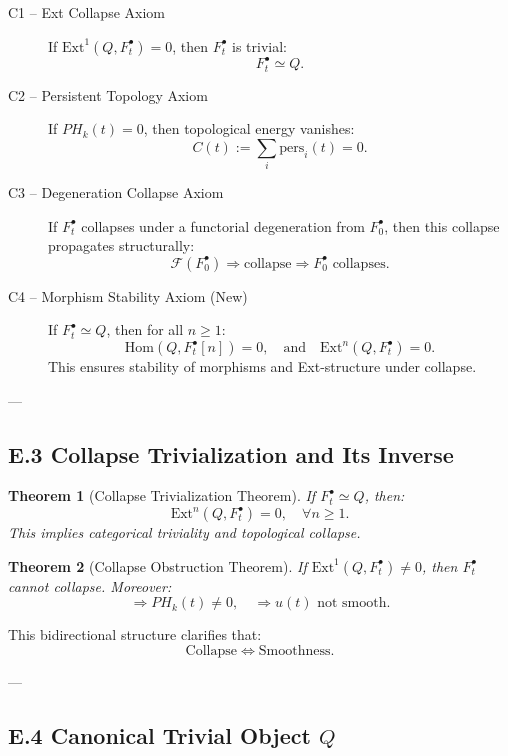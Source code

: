 \documentclass[11pt]{article}
\newtheorem{theorem}{Theorem}[section]
\begin{document}
\begin{description}
  \item[C1 – Ext Collapse Axiom]  
  If $\mathrm{Ext}^1(Q, F^\bullet_t) = 0$, then $F^\bullet_t$ is trivial:
  \[
  F^\bullet_t \simeq Q.
  \]

  \item[C2 – Persistent Topology Axiom]  
  If $PH_k(t) = 0$, then topological energy vanishes:
  \[
  C(t) := \sum_i \text{pers}_i(t) = 0.
  \]

  \item[C3 – Degeneration Collapse Axiom]  
  If $F^\bullet_t$ collapses under a functorial degeneration from $F^\bullet_0$,  
  then this collapse propagates structurally:
  \[
  \mathcal{F}(F^\bullet_0) \Rightarrow \text{collapse} \Rightarrow F^\bullet_0 \text{ collapses.}
  \]

  \item[C4 – Morphism Stability Axiom (New)]  
  If $F^\bullet_t \simeq Q$, then for all $n \geq 1$:
  \[
  \mathrm{Hom}(Q, F^\bullet_t[n]) = 0,
  \quad \text{and} \quad
  \mathrm{Ext}^n(Q, F^\bullet_t) = 0.
  \]
  This ensures stability of morphisms and Ext-structure under collapse.
\end{description}

---

\subsection*{E.3 Collapse Trivialization and Its Inverse}

\begin{theorem}[Collapse Trivialization Theorem]
If $F^\bullet_t \simeq Q$, then:
\[
\mathrm{Ext}^n(Q, F^\bullet_t) = 0, \quad \forall n \geq 1.
\]
This implies categorical triviality and topological collapse.
\end{theorem}

\begin{theorem}[Collapse Obstruction Theorem]
If $\mathrm{Ext}^1(Q, F^\bullet_t) \neq 0$, then $F^\bullet_t$ cannot collapse.  
Moreover:
\[
\Rightarrow PH_k(t) \neq 0, \quad \Rightarrow u(t) \text{ not smooth}.
\]
\end{theorem}

This bidirectional structure clarifies that:
\[
\text{Collapse} \Leftrightarrow \text{Smoothness}.
\]

---

\subsection*{E.4 Canonical Trivial Object $Q$}
\end{document}
